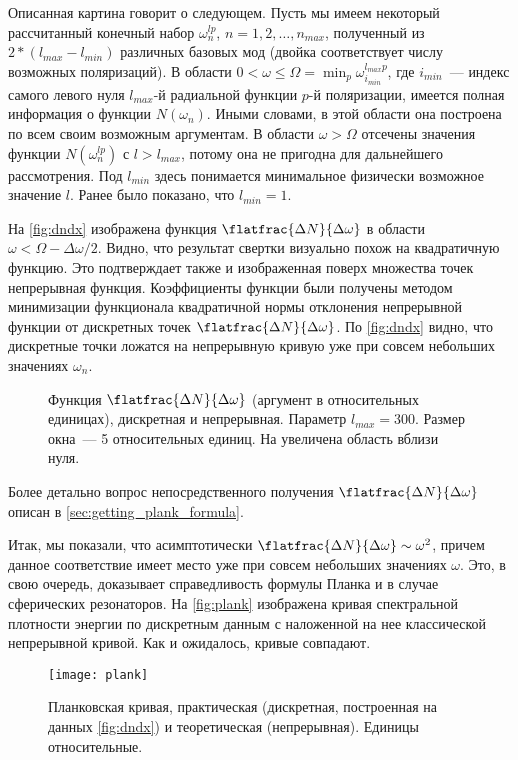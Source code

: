     Описанная картина говорит о следующем. Пусть мы имеем некоторый рассчитанный конечный набор $\omega^{lp}_n$, $n = 1, 2, \dots, n_{max}$, полученный из $2 * (l_{max} - l_{min})$ различных базовых мод (двойка соответствует числу возможных поляризаций). В области $0 < \omega \le \Omega = \min_p{\omega^{l_{max}p}_{i_{min}}}$, где $i_{min}$~--- индекс самого левого нуля $l_{max}$-й радиальной функции $p$-й поляризации, имеется полная информация о функции $N(\omega_n)$. Иными словами, в этой области она построена по всем своим возможным аргументам. В области $\omega > \Omega$ отсечены значения функции $N(\omega^{lp}_n)$ с $l > l_{max}$, потому она не пригодна для дальнейшего рассмотрения. Под $l_{min}$ здесь понимается минимальное физически возможное значение $l$. Ранее было показано, что $l_{min} = 1$.

    На \autoref{fig:dndx} изображена функция $\flatfrac{\Delta N}{\Delta \omega}$ в области $\omega < \Omega - \Delta\omega / 2$. Видно, что результат свертки визуально похож на квадратичную функцию. Это подтверждает также и изображенная поверх множества точек непрерывная функция. Коэффициенты функции были получены методом минимизации функционала квадратичной нормы отклонения непрерывной функции от дискретных точек $\flatfrac{\Delta N}{\Delta \omega}$. По \autoref{fig:dndx} видно, что дискретные точки ложатся на непрерывную кривую уже при совсем небольших значениях $\omega_n$.
    \begin{figure}[h]
        \centering
        \hspace{8pt}%
        \hspace{8pt}%
        \caption[]{Функция $\flatfrac{\Delta N}{\Delta \omega}$ (аргумент в относительных единицах), дискретная и непрерывная. Параметр $l_{max} = 300$. Размер окна~--- 5 относительных единиц. На  увеличена область вблизи нуля. %
        } %
        \label{fig:dndx}%
    \end{figure}

    Более детально вопрос непосредственного получения $\flatfrac{\Delta N}{\Delta \omega}$ описан в \autoref{sec:getting_plank_formula}.

    Итак, мы показали, что асимптотически $\flatfrac{\Delta N}{\Delta \omega} \sim \omega^2$, причем данное соответствие имеет место уже при совсем небольших значениях $\omega$. Это, в свою очередь, доказывает справедливость формулы Планка и в случае сферических резонаторов. На \autoref{fig:plank} изображена кривая спектральной плотности энергии по дискретным данным с наложенной на нее классической непрерывной кривой. Как и ожидалось, кривые совпадают.
    \begin{figure}[h]
        \centering
        \texttt{[image: plank]}
        \caption[]{Планковская кривая, практическая (дискретная, построенная на данных \autoref{fig:dndx}) и теоретическая (непрерывная). Единицы относительные.}
        \label{fig:plank}
    \end{figure}
